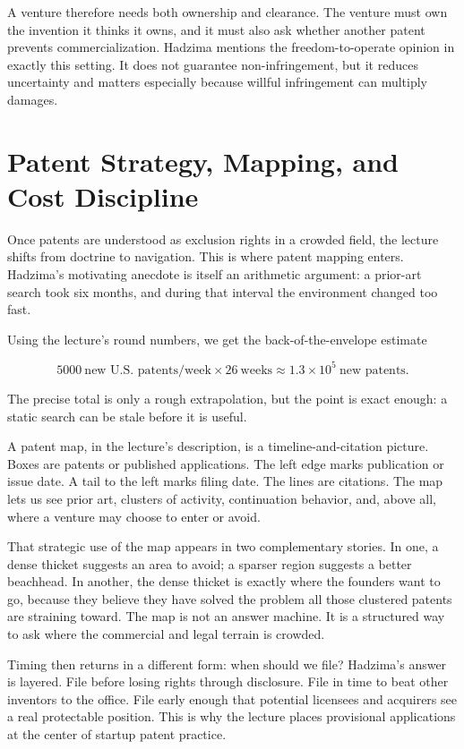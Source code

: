 A venture therefore needs both ownership and clearance. The venture must own the invention it thinks it owns, and it must also ask whether another patent prevents commercialization. Hadzima mentions the freedom-to-operate opinion in exactly this setting. It does not guarantee non-infringement, but it reduces uncertainty and matters especially because willful infringement can multiply damages.

\section{Patent Strategy, Mapping, and Cost Discipline}

Once patents are understood as exclusion rights in a crowded field, the lecture shifts from doctrine to navigation. This is where patent mapping enters. Hadzima's motivating anecdote is itself an arithmetic argument: a prior-art search took six months, and during that interval the environment changed too fast.

Using the lecture's round numbers, we get the back-of-the-envelope estimate

\begin{equation}
5000\ \text{new U.S. patents/week}\times 26\ \text{weeks}\approx 1.3\times 10^5\ \text{new patents}.
\end{equation}

The precise total is only a rough extrapolation, but the point is exact enough: a static search can be stale before it is useful.

A patent map, in the lecture's description, is a timeline-and-citation picture. Boxes are patents or published applications. The left edge marks publication or issue date. A tail to the left marks filing date. The lines are citations. The map lets us see prior art, clusters of activity, continuation behavior, and, above all, where a venture may choose to enter or avoid.

That strategic use of the map appears in two complementary stories. In one, a dense thicket suggests an area to avoid; a sparser region suggests a better beachhead. In another, the dense thicket is exactly where the founders want to go, because they believe they have solved the problem all those clustered patents are straining toward. The map is not an answer machine. It is a structured way to ask where the commercial and legal terrain is crowded.

Timing then returns in a different form: when should we file? Hadzima's answer is layered. File before losing rights through disclosure. File in time to beat other inventors to the office. File early enough that potential licensees and acquirers see a real protectable position. This is why the lecture places provisional applications at the center of startup patent practice.

